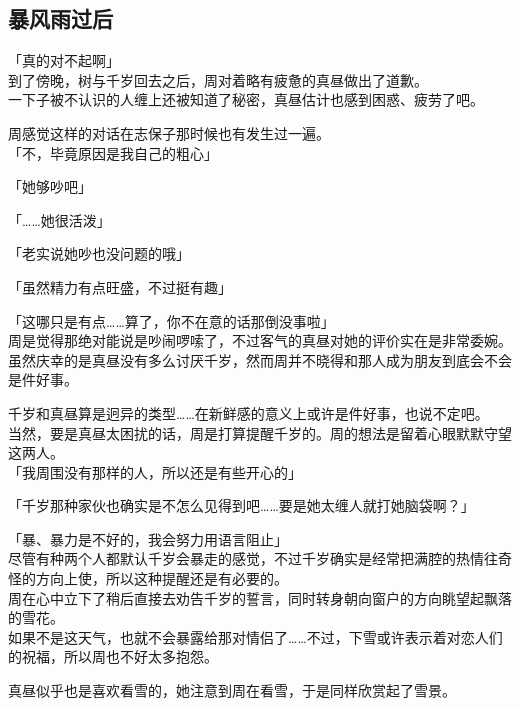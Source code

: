 \subsection{暴风雨过后}

「真的对不起啊」\\

到了傍晚，树与千岁回去之后，周对着略有疲惫的真昼做出了道歉。\\

一下子被不认识的人缠上还被知道了秘密，真昼估计也感到困惑、疲劳了吧。

周感觉这样的对话在志保子那时候也有发生过一遍。\\

「不，毕竟原因是我自己的粗心」

「她够吵吧」

「……她很活泼」

「老实说她吵也没问题的哦」

「虽然精力有点旺盛，不过挺有趣」

「这哪只是有点……算了，你不在意的话那倒没事啦」\\

周是觉得那绝对能说是吵闹啰嗦了，不过客气的真昼对她的评价实在是非常委婉。\\

虽然庆幸的是真昼没有多么讨厌千岁，然而周并不晓得和那人成为朋友到底会不会是件好事。

千岁和真昼算是迥异的类型……在新鲜感的意义上或许是件好事，也说不定吧。\\

当然，要是真昼太困扰的话，周是打算提醒千岁的。周的想法是留着心眼默默守望这两人。\\

「我周围没有那样的人，所以还是有些开心的」

「千岁那种家伙也确实是不怎么见得到吧……要是她太缠人就打她脑袋啊？」

「暴、暴力是不好的，我会努力用语言阻止」\\

尽管有种两个人都默认千岁会暴走的感觉，不过千岁确实是经常把满腔的热情往奇怪的方向上使，所以这种提醒还是有必要的。\\

周在心中立下了稍后直接去劝告千岁的誓言，同时转身朝向窗户的方向眺望起飘落的雪花。\\

如果不是这天气，也就不会暴露给那对情侣了……不过，下雪或许表示着对恋人们的祝福，所以周也不好太多抱怨。

真昼似乎也是喜欢看雪的，她注意到周在看雪，于是同样欣赏起了雪景。\\

